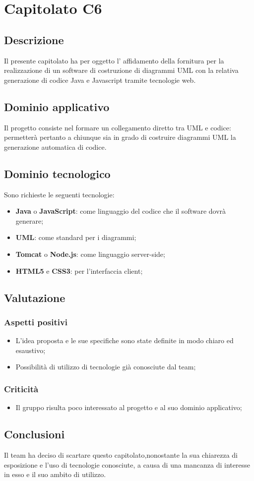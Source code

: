 \section {Capitolato C6}
	\subsection {Descrizione}
	Il presente capitolato ha per oggetto l’ affidamento della fornitura per la realizzazione
di un software di costruzione di diagrammi UML con la relativa generazione di codice
Java e Javascript tramite tecnologie web.
	\subsection {Dominio applicativo}
	Il progetto consiste nel formare un collegamento diretto tra UML e codice: permetterà pertanto a chiunque sia in grado di costruire diagrammi UML la generazione automatica di codice.
	\subsection {Dominio tecnologico}
	Sono richieste le seguenti tecnologie:
	\begin {itemize}
	\item \textbf{Java} o \textbf{JavaScript}: come linguaggio del codice che il software dovrà generare;
	\item \textbf{UML}: come standard per i diagrammi;
	\item \textbf{Tomcat} o \textbf{Node.js}: come linguaggio server-side;
	\item \textbf{HTML5} e \textbf{CSS3}: per l'interfaccia client;
	\end {itemize}
	\subsection {Valutazione}
		\subsubsection {Aspetti positivi}
			\begin {itemize}
			 	\item L'idea proposta e le sue specifiche sono state definite in modo chiaro ed esaustivo;
			 	\item Possibilità di utilizzo di tecnologie già conosciute dal team;
			\end {itemize}
		\subsubsection {Criticità}
			\begin {itemize}
				\item Il gruppo risulta poco interessato al progetto e al suo dominio applicativo;
			\end {itemize}
	\subsection {Conclusioni}
	Il team ha deciso di scartare questo capitolato,nonostante la sua chiarezza di esposizione e l'uso di tecnologie conosciute, a causa di una mancanza di interesse in esso e il suo ambito di utilizzo.